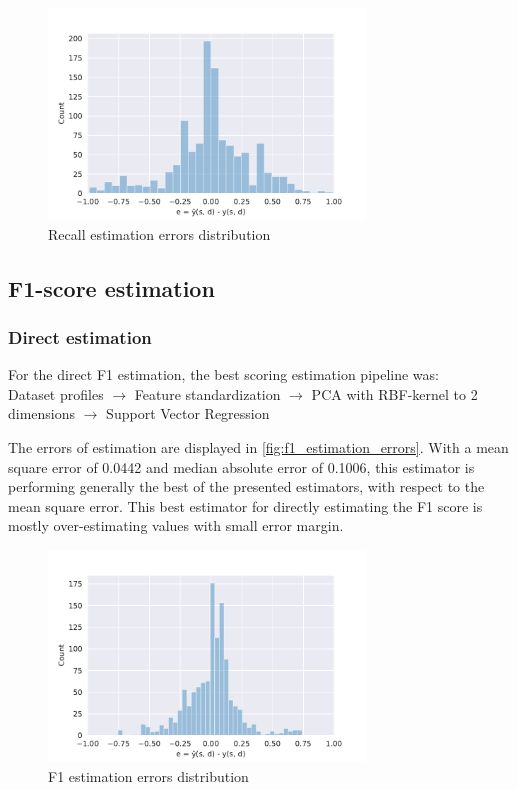 \begin{figure}[h]
    \centering
    \includegraphics[width=0.75\textwidth]{thesis/Figures/RQ2/15_error_histogramcell_rec.pdf}
    \caption{Recall estimation errors distribution}
    \label{fig:rec_estimation_errors}
\end{figure}

\subsection{F1-score estimation}
\subsubsection{Direct estimation}
For the direct F1 estimation, the best scoring estimation pipeline was:
~\\Dataset profiles $\rightarrow$ Feature standardization $\rightarrow$ PCA with RBF-kernel to 2 dimensions $\rightarrow$ Support Vector Regression

The errors of estimation are displayed in \autoref{fig:f1_estimation_errors}. With a mean square error of 0.0442 and median absolute error of 0.1006, this estimator is performing generally the best of the presented estimators, with respect to the mean square error. This best estimator for directly estimating the F1 score is mostly over-estimating values with small error margin.  

\begin{figure}[H]
    \centering
    \includegraphics[width=0.75\textwidth]{thesis/Figures/RQ2/15_error_histogramcell_f1.pdf}
    \caption{F1 estimation errors distribution}
    \label{fig:f1_estimation_errors}
\end{figure}

